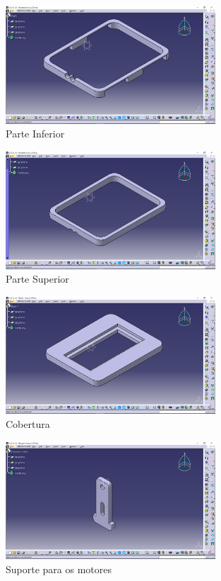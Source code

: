 \begin{figure}[H]
    \centering
    \includegraphics[width=0.7\textwidth]{figuras/inferior.eps}
    \caption{Parte Inferior}
    \label{fig:inferior}
\end{figure}


\begin{figure}[H]
    \centering
    \includegraphics[width=0.7\textwidth]{figuras/superior.eps}
    \caption{Parte Superior}
    \label{fig:superior}
\end{figure}


\begin{figure}[H]
    \centering
    \includegraphics[width=0.7\textwidth]{figuras/cobertura.eps}
    \caption{Cobertura}
    \label{fig:cobertura}
\end{figure}


\begin{figure}[H]
    \centering
    \includegraphics[width=0.7\textwidth]{figuras/sp_motor.eps}
    \caption{Suporte para os motores}
    \label{fig:sp_motor}
\end{figure}


